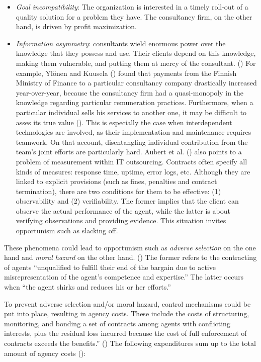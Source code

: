 \documentclass[
  man,floatsintext]{apa6}
\providecommand{\tightlist}{%
  \setlength{\itemsep}{0pt}\setlength{\parskip}{0pt}}
\begin{document}
\begin{itemize}
\tightlist
\item
  \emph{Goal incompatibility}: The organization is interested in a timely roll-out of a quality solution for a problem they have. The consultancy firm, on the other hand, is driven by profit maximization.
\item
  \emph{Information asymmetry}: consultants wield enormous power over the knowledge that they possess and use. Their clients depend on this knowledge, making them vulnerable, and putting them at mercy of the consultant. () For example, Ylönen and Kuusela () found that payments from the Finnish Ministry of Finance to a particular consultancy company drastically increased year-over-year, because the consultancy firm had a quasi-monopoly in the knowledge regarding particular remuneration practices. Furthermore, when a particular individual sells his services to another one, it may be difficult to asses its true value (). This is especially the case when interdependent technologies are involved, as their implementation and maintenance requires teamwork. On that account, disentangling individual contribution from the team's joint efforts are particularly hard. Aubert et al. () also points to a problem of measurement within IT outsourcing. Contracts often specify all kinds of measures: response time, uptime, error logs, etc. Although they are linked to explicit provisions (such as fines, penalties and contract termination), there are two conditions for them to be effective: (1) observability and (2) verifiability. The former implies that the client can observe the actual performance of the agent, while the latter is about verifying observations and providing evidence. This situation invites opportunism such as slacking off.
\end{itemize}

These phenomena could lead to opportunism such as \emph{adverse selection} on the one hand and \emph{moral hazard} on the other hand. () The former refers to the contracting of agents ``unqualified to fulfill their end of the bargain due to active misrepresentation of the agent's competence and expertise.'' The latter occurs when ``the agent shirks and reduces his or her efforts.''

To prevent adverse selection and/or moral hazard, control mechanisms could be put into place, resulting in agency costs. These include the costs of structuring, monitoring, and bonding a set of contracts among agents with conflicting interests, plus the residual loss incurred because the cost of full enforcement of contracts exceeds the benefits.'' () The following expenditures sum up to the total amount of agency costs ():
\end{document}
